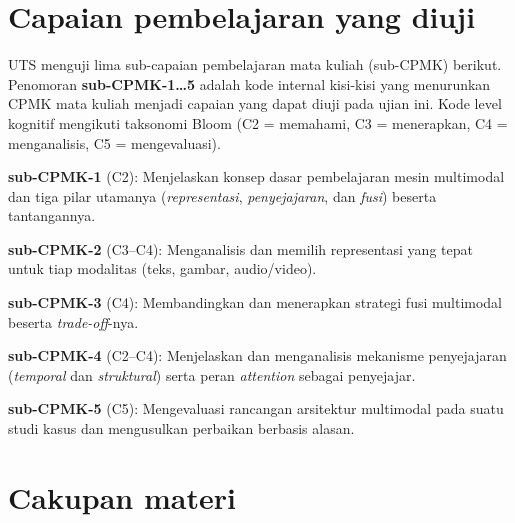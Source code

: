 \documentclass[12pt, a4paper]{article}
\begin{document}
\section{Capaian pembelajaran yang diuji}\label{sec:cpmk}

UTS menguji lima sub-capaian pembelajaran mata kuliah (sub-CPMK) berikut.
Penomoran \textbf{sub-CPMK-1\ldots5} adalah kode internal kisi-kisi yang
menurunkan CPMK mata kuliah menjadi capaian yang dapat diuji pada ujian ini.
Kode level kognitif mengikuti taksonomi Bloom (C2 = memahami, C3 = menerapkan,
C4 = menganalisis, C5 = mengevaluasi).

\begin{objectives}
  \item \textbf{sub-CPMK-1} (C2): Menjelaskan konsep dasar pembelajaran mesin
        multimodal dan tiga pilar utamanya (\emph{representasi},
        \emph{penyejajaran}, dan \emph{fusi}) beserta tantangannya.
  \item \textbf{sub-CPMK-2} (C3--C4): Menganalisis dan memilih representasi yang
        tepat untuk tiap modalitas (teks, gambar, audio/video).
  \item \textbf{sub-CPMK-3} (C4): Membandingkan dan menerapkan strategi fusi
        multimodal beserta \emph{trade-off}-nya.
  \item \textbf{sub-CPMK-4} (C2--C4): Menjelaskan dan menganalisis mekanisme
        penyejajaran (\emph{temporal} dan \emph{struktural}) serta peran
        \emph{attention} sebagai penyejajar.
  \item \textbf{sub-CPMK-5} (C5): Mengevaluasi rancangan arsitektur multimodal
        pada suatu studi kasus dan mengusulkan perbaikan berbasis alasan.
\end{objectives}

\section{Cakupan materi}\label{sec:cakupan}
\end{document}
